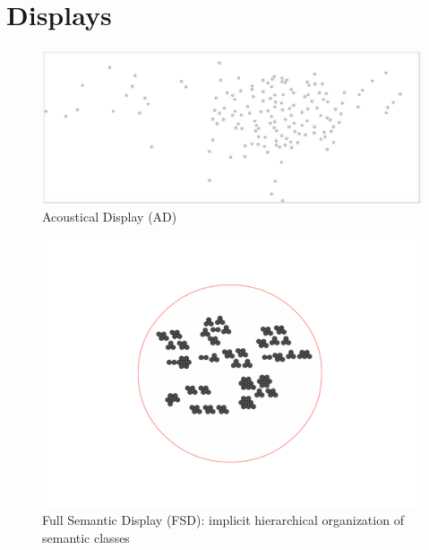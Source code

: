 \documentclass{aes2e}
\begin{document}

\section{Displays} \label{display}

\begin{figure}[t]
\begin{center}
\includegraphics[scale=0.18]{gfx/XP3.pdf} 
\end{center}
\caption{\label{figXP3} Acoustical Display (AD)}
\end{figure}

\begin{figure}[t!]
\begin{center}
\includegraphics[scale=0.30]{gfx/XP2clean.pdf} 
\end{center}
\caption{\label{figXP2} Full Semantic Display (FSD): implicit hierarchical organization of semantic classes }
\end{figure}
\end{document}
